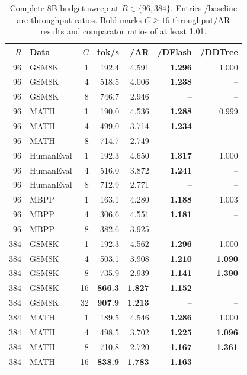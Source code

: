 \documentclass{article}
\begin{document}
\clearpage
\begin{table}[H]
\caption{Complete 8B budget sweep at $R\in\{96,384\}$. Entries /baseline are throughput ratios. Bold marks $C\geq16$ throughput/AR results and comparator ratios of at least 1.01.}
\label{tab:budget-8b}
\centering\small
\setlength{\tabcolsep}{4.5pt}
\renewcommand{\arraystretch}{1.06}
\begin{tabular}{@{}rlrrrrr@{}}
\toprule
$R$ & Data & $C$ & tok/s & /AR & /DFlash & /DDTree\\
\midrule
96 & GSM8K & 1 & 192.4 & 4.591 & \textbf{1.296} & 1.000\\
96 & GSM8K & 4 & 518.5 & 4.006 & \textbf{1.238} & --\\
96 & GSM8K & 8 & 746.7 & 2.946 & -- & --\\
96 & MATH & 1 & 190.0 & 4.536 & \textbf{1.288} & 0.999\\
96 & MATH & 4 & 499.0 & 3.714 & \textbf{1.234} & --\\
96 & MATH & 8 & 714.7 & 2.749 & -- & --\\
96 & HumanEval & 1 & 192.3 & 4.650 & \textbf{1.317} & 1.000\\
96 & HumanEval & 4 & 516.0 & 3.872 & \textbf{1.241} & --\\
96 & HumanEval & 8 & 712.9 & 2.771 & -- & --\\
96 & MBPP & 1 & 163.1 & 4.280 & \textbf{1.188} & 1.003\\
96 & MBPP & 4 & 306.6 & 4.551 & \textbf{1.181} & --\\
96 & MBPP & 8 & 382.6 & 3.925 & -- & --\\
384 & GSM8K & 1 & 192.3 & 4.562 & \textbf{1.296} & 1.000\\
384 & GSM8K & 4 & 503.1 & 3.908 & \textbf{1.210} & \textbf{1.090}\\
384 & GSM8K & 8 & 735.9 & 2.939 & \textbf{1.141} & \textbf{1.390}\\
384 & GSM8K & 16 & \textbf{866.3} & \textbf{1.827} & \textbf{1.152} & --\\
384 & GSM8K & 32 & \textbf{907.9} & \textbf{1.213} & -- & --\\
384 & MATH & 1 & 189.5 & 4.546 & \textbf{1.286} & 1.000\\
384 & MATH & 4 & 498.5 & 3.702 & \textbf{1.225} & \textbf{1.096}\\
384 & MATH & 8 & 710.8 & 2.720 & \textbf{1.167} & \textbf{1.361}\\
384 & MATH & 16 & \textbf{838.9} & \textbf{1.783} & \textbf{1.163} & --\\

\end{tabular}
\end{table}
\end{document}
